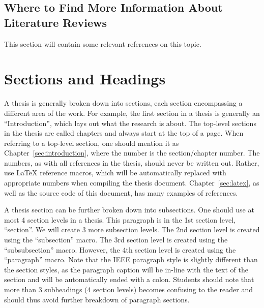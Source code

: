 
\subsection{Where to Find More Information About Literature Reviews}\label{sec:literature_review:more_info}

This section will contain some relevant references on this topic.

\section{Sections and Headings}\label{sec:sections}
A thesis is generally broken down into sections, each section encompassing a different area of the work. For example, the first section in a thesis is generally an ``Introduction'', which lays out what the research is about. The top-level sections in the thesis are called chapters and always start at the top of a page. When referring to a top-level section, one should mention it as Chapter~\ref{sec:introduction}, where the number is the section/chapter number. The numbers, as with all references in the thesis, should never be written out. Rather, use LaTeX reference macros, which will be automatically replaced with appropriate numbers when compiling the thesis document. Chapter~\ref{sec:latex}, as well as the source code of this document, has many examples of references.

A thesis section can be further broken down into subsections. One should use at most 4 section levels in a thesis. This paragraph is in the 1st section level, ``section''. We will create 3 more subsection levels. The 2nd section level is created using the ``subsection'' macro. The 3rd section level is created using the ``subsubsection'' macro. However, the 4th section level is created using the ``paragraph'' macro. Note that the IEEE paragraph style is slightly different than the section styles, as the paragraph caption will be in-line with the text of the section and will be automatically ended with a colon. Students should note that more than 3 subheadings (4 section levels) becomes confusing to the reader and should thus avoid further breakdown of paragraph sections.

